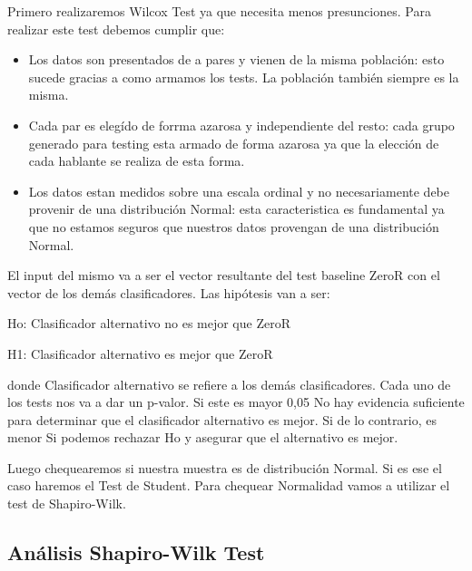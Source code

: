\documentclass[11pt,a4paper,twoside]{tesis}
\begin{document}
Primero realizaremos Wilcox Test ya que necesita menos presunciones. Para realizar este test debemos cumplir que:

\begin{itemize}
    \item Los datos son presentados de a pares y vienen de la misma población: esto sucede gracias a como armamos los tests. La población también siempre es la misma.
    \item Cada par es elegído de forrma azarosa y independiente del resto: cada grupo generado para testing esta armado de forma azarosa ya que la elección de cada hablante se realiza de esta forma.
    \item Los datos estan medidos sobre una escala ordinal y no necesariamente debe provenir de una distribución Normal: esta caracteristica es fundamental ya que no estamos seguros que nuestros datos provengan de una distribución Normal.
\end{itemize}

El input del mismo va a ser el vector resultante del test baseline ZeroR con el vector de los demás clasificadores. Las hipótesis van a ser:

\vspace{0.5cm}
\hspace{2cm}Ho: Clasificador alternativo no es mejor que ZeroR
\vspace{0.25cm}

\hspace{2cm}H1: Clasificador alternativo es mejor que ZeroR
\vspace{0.5cm}

donde Clasificador alternativo se refiere a los demás clasificadores. 
Cada uno de los tests nos va a dar un p-valor.
Si este es mayor 0,05 No hay evidencia suficiente para determinar que el clasificador alternativo es mejor.
Si de lo contrario, es menor Si podemos rechazar Ho y asegurar que el alternativo es mejor. 

Luego chequearemos si nuestra muestra es de distribución Normal. Si es ese el caso haremos el Test de Student. Para chequear Normalidad vamos a utilizar el test de Shapiro-Wilk.

\subsection{Análisis Shapiro-Wilk Test}
\end{document}
